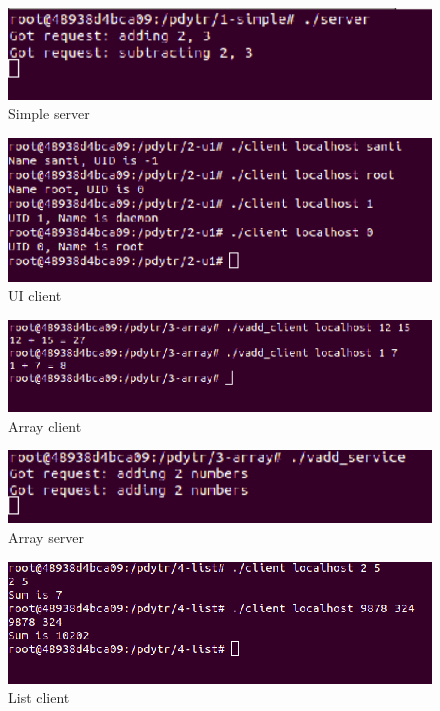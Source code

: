 \documentclass[12pt,journal,compsoc]{IEEEtran}
\begin{document}
\begin{figure}[H]
\centering
\includegraphics[width=125mm]{capturas/1-simple-server.png}
\caption{Simple server}
\label{fig:1-simple-server}
\end{figure}

\begin{figure}[H]
\centering
\includegraphics[width=125mm]{capturas/2-ui-client.png}
\caption{UI client}
\label{fig:2-ui-client}
\end{figure}

\begin{figure}[H]
\centering
\includegraphics[width=125mm]{capturas/3-array-client.png}
\caption{Array client}
\label{fig:3-array-client}
\end{figure}

\begin{figure}[H]
\centering
\includegraphics[width=125mm]{capturas/3-array-server.png}
\caption{Array server}
\label{fig:3-array-server}
\end{figure}

\begin{figure}[H]
\centering
\includegraphics[width=125mm]{capturas/4-list-client.png}
\caption{List client}
\label{fig:4-list-client}
\end{figure}
\end{document}
